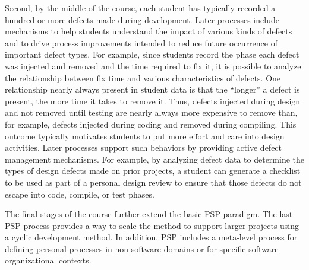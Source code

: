 Second, by the middle of the course, each student has typically recorded a
hundred or more defects made during development.  Later processes
include mechanisms to help students understand the impact of various kinds
of defects and to drive process improvements intended to reduce future
occurrence of important defect types. For example, since students record
the phase each defect was injected and removed and the time required to fix
it, it is possible to analyze the relationship between fix time and various
characteristics of defects.  One relationship nearly
always present in student data is that the ``longer'' a defect is present,
the more time it takes to remove it.  Thus, defects injected during design
and not removed until testing are nearly always more expensive to remove
than, for example, defects injected during coding and removed during
compiling. This outcome typically motivates students to put more effort and
care into design activities. Later processes support such behaviors by
providing active defect management mechanisms. For example, by analyzing
defect data to determine the types of design defects made on prior
projects, a student can generate a checklist to be used as part of a
personal design review to ensure that those defects do not escape into
code, compile, or test phases.

The final stages of the course further extend the basic PSP para\-digm.  The
last PSP process provides a way to scale the method to support larger
projects using a cyclic development method. In addition, PSP includes a
meta-level process for defining personal processes in non-software domains
or for specific software organizational contexts.

